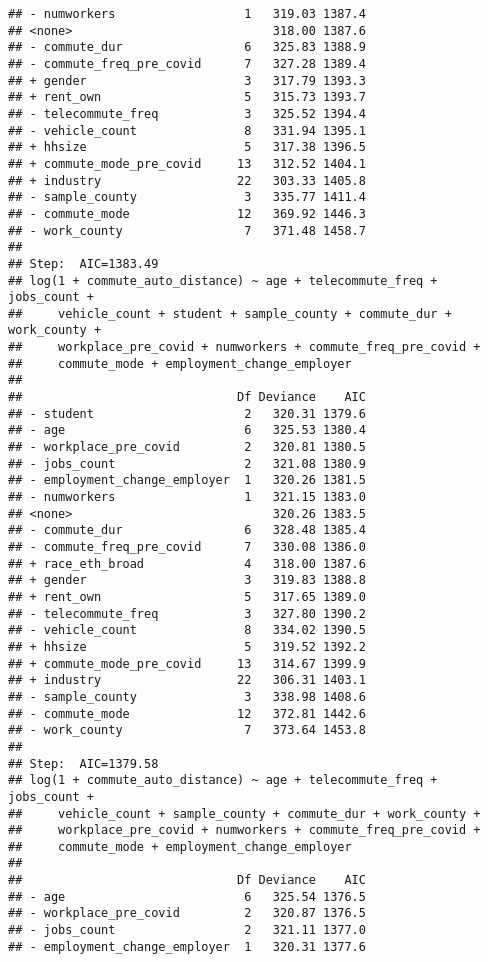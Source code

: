 \documentclass[
]{article}
\begin{document}
\begin{verbatim}
## - numworkers                  1   319.03 1387.4
## <none>                            318.00 1387.6
## - commute_dur                 6   325.83 1388.9
## - commute_freq_pre_covid      7   327.28 1389.4
## + gender                      3   317.79 1393.3
## + rent_own                    5   315.73 1393.7
## - telecommute_freq            3   325.52 1394.4
## - vehicle_count               8   331.94 1395.1
## + hhsize                      5   317.38 1396.5
## + commute_mode_pre_covid     13   312.52 1404.1
## + industry                   22   303.33 1405.8
## - sample_county               3   335.77 1411.4
## - commute_mode               12   369.92 1446.3
## - work_county                 7   371.48 1458.7
## 
## Step:  AIC=1383.49
## log(1 + commute_auto_distance) ~ age + telecommute_freq + jobs_count + 
##     vehicle_count + student + sample_county + commute_dur + work_county + 
##     workplace_pre_covid + numworkers + commute_freq_pre_covid + 
##     commute_mode + employment_change_employer
## 
##                              Df Deviance    AIC
## - student                     2   320.31 1379.6
## - age                         6   325.53 1380.4
## - workplace_pre_covid         2   320.81 1380.5
## - jobs_count                  2   321.08 1380.9
## - employment_change_employer  1   320.26 1381.5
## - numworkers                  1   321.15 1383.0
## <none>                            320.26 1383.5
## - commute_dur                 6   328.48 1385.4
## - commute_freq_pre_covid      7   330.08 1386.0
## + race_eth_broad              4   318.00 1387.6
## + gender                      3   319.83 1388.8
## + rent_own                    5   317.65 1389.0
## - telecommute_freq            3   327.80 1390.2
## - vehicle_count               8   334.02 1390.5
## + hhsize                      5   319.52 1392.2
## + commute_mode_pre_covid     13   314.67 1399.9
## + industry                   22   306.31 1403.1
## - sample_county               3   338.98 1408.6
## - commute_mode               12   372.81 1442.6
## - work_county                 7   373.64 1453.8
## 
## Step:  AIC=1379.58
## log(1 + commute_auto_distance) ~ age + telecommute_freq + jobs_count + 
##     vehicle_count + sample_county + commute_dur + work_county + 
##     workplace_pre_covid + numworkers + commute_freq_pre_covid + 
##     commute_mode + employment_change_employer
## 
##                              Df Deviance    AIC
## - age                         6   325.54 1376.5
## - workplace_pre_covid         2   320.87 1376.5
## - jobs_count                  2   321.11 1377.0
## - employment_change_employer  1   320.31 1377.6

\end{verbatim}
\end{document}
